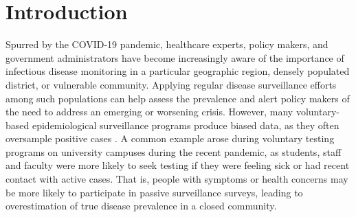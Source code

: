 \documentclass[useAMS,usenatbib,referee]{biom}
\begin{document}
%

\section{Introduction}
Spurred by the COVID-19 pandemic, healthcare experts, policy makers, and government administrators have become increasingly aware of the importance of infectious disease monitoring in a particular geographic region, densely populated district, or vulnerable community. Applying regular disease surveillance efforts among such populations can help assess the prevalence and alert policy makers of the need to address an emerging or worsening crisis. However, many voluntary-based epidemiological surveillance programs produce biased data, as they often oversample positive cases \citep{Menni2020}. A common example arose during voluntary testing programs on university campuses during the recent pandemic, as students, staff and faculty were more likely to seek testing if they were feeling sick or had recent contact with active cases. That is, people with symptoms or health concerns may be more likely to participate in passive surveillance surveys, leading to overestimation of true disease prevalence in a closed community. 
\end{document}

